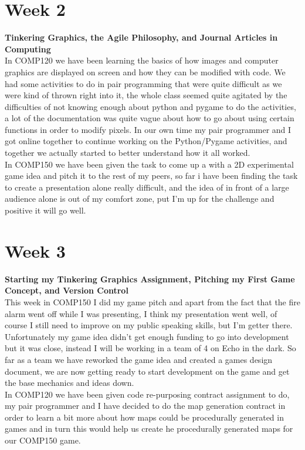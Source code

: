 \documentclass[11pt]{article}
\begin{document}
{\section*{Week 2}
{\small \textbf{Tinkering Graphics, the Agile Philosophy, and Journal Articles in Computing}}\\
In COMP120 we have been learning the basics of how images and computer graphics are displayed on screen and how they can be modified with code. We had some activities to do in pair programming that were quite difficult as we were kind of thrown right into it, the whole class seemed quite agitated by the difficulties of not knowing enough about python and pygame to do the activities, a lot of the documentation was quite vague about how to go about using certain functions in order to modify pixels. In our own time my pair programmer and I got online together to continue working on the Python/Pygame activities, and together we actually started to better understand how it all worked.\\
In COMP150 we have been given the task to come up a with a 2D experimental game idea and pitch it to the rest of my peers, so far i have been finding the task to create a presentation alone really difficult, and the idea of  in front of a large audience alone is out of my comfort zone, put I'm up for the challenge and positive it will go well.
}


{\section*{Week 3}
{\small \textbf{Starting my Tinkering Graphics Assignment, Pitching my First Game Concept, and Version Control}}\\
This week in COMP150 I did my game pitch and apart from the fact that the fire alarm went off while I was presenting, I think my presentation went well, of course I still need to improve on my public speaking skills, but I'm getter there. Unfortunately my game idea didn't get enough funding to go into development but it was close, instead I will be working in a team of 4 on Echo in the dark. So far as a team we have reworked the game idea and created a games design document, we are now getting ready to start development on the game and get the base mechanics and ideas down.\\
In COMP120 we have been given code re-purposing contract assignment to do, my pair programmer and I have decided to do the map generation contract in order to learn a bit more about how maps could be procedurally generated in games and in turn this would help us create he procedurally generated maps for our COMP150 game.
}
\end{document}
